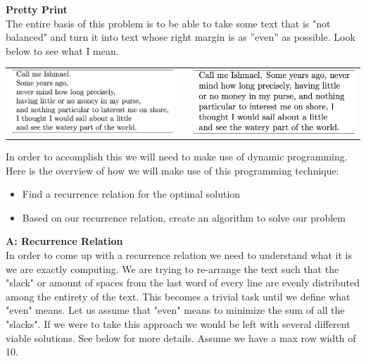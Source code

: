 \documentclass[11pt]{article}
\begin{document}
\newpage
\begin{solution} \textbf{Pretty Print}\\

	The entire basis of this problem is to be able to take some text that is "not balanced" and turn it into text whose right margin is as ”even” as possible. Look below to see what I mean.
		
		\hfil
		
		\begin{center}
			\begin{tabular}{ c c c}
 				\includegraphics[width=7cm]{images/unbalanced} & \rightarrow &  \includegraphics[width=7cm]{images/balanced}
			\end{tabular}
		\end{center}
		
	\hfil
	
	In order to accomplish this we will need to make use of dynamic programming. Here is the overview of how we will make use of this programming technique:
	
	\hfil
	
	\begin{itemize}
  		\item Find a recurrence relation for the optimal solution
  		\item Based on our recurrence relation, create an algorithm to solve our problem
	\end{itemize}
	
	
	\hfil


	\textbf{A: Recurrence Relation} \\
	
	In order to come up with a recurrence relation we need to understand what it is we are exactly computing. We are trying to re-arrange the text such that the "slack" or amount of spaces from the last word of every line are evenly distributed among the entirety of the text. This becomes a trivial task until we define what "even" means. Let us assume that "even" means to minimize the sum of all the "slacks". If we were to take this approach we would be left with several different viable solutions. See below for more details. Assume we have a max row width of 10.
	

\end{solution}
\end{document}
